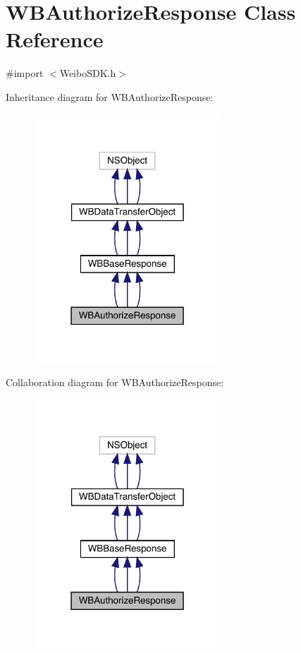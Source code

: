 \hypertarget{interface_w_b_authorize_response}{}\section{W\+B\+Authorize\+Response Class Reference}
\label{interface_w_b_authorize_response}


{\ttfamily \#import $<$Weibo\+S\+D\+K.\+h$>$}



Inheritance diagram for W\+B\+Authorize\+Response\+:\nopagebreak
\begin{figure}[H]
\begin{center}
\leavevmode
\includegraphics[width=199pt]{interface_w_b_authorize_response__inherit__graph}
\end{center}
\end{figure}


Collaboration diagram for W\+B\+Authorize\+Response\+:\nopagebreak
\begin{figure}[H]
\begin{center}
\leavevmode
\includegraphics[width=199pt]{interface_w_b_authorize_response__coll__graph}
\end{center}
\end{figure}
